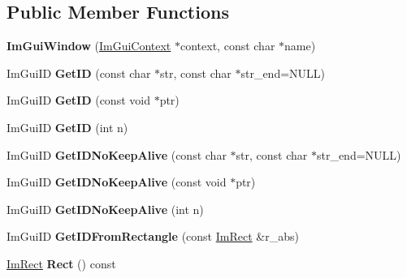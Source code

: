 \subsection*{Public Member Functions}
\begin{DoxyCompactItemize}
\item 
\mbox{\label{structImGuiWindow_acd2909ae3b7079de81d528327cc11dfd}} 
{\bfseries Im\+Gui\+Window} (\hyperlink{structImGuiContext}{Im\+Gui\+Context} $\ast$context, const char $\ast$name)
\item 
\mbox{\label{structImGuiWindow_a66400a63bc0b54d7d29e08d1b1b1a42b}} 
Im\+Gui\+ID {\bfseries Get\+ID} (const char $\ast$str, const char $\ast$str\+\_\+end=N\+U\+LL)
\item 
\mbox{\label{structImGuiWindow_aae21dffb343cabca9414499b827912a8}} 
Im\+Gui\+ID {\bfseries Get\+ID} (const void $\ast$ptr)
\item 
\mbox{\label{structImGuiWindow_a122c47ded974724a192912883fb8e0e9}} 
Im\+Gui\+ID {\bfseries Get\+ID} (int n)
\item 
\mbox{\label{structImGuiWindow_adc0a43f74a0b53a15a4bc4fea05524fe}} 
Im\+Gui\+ID {\bfseries Get\+I\+D\+No\+Keep\+Alive} (const char $\ast$str, const char $\ast$str\+\_\+end=N\+U\+LL)
\item 
\mbox{\label{structImGuiWindow_aea0ace882f6e8ec9d6825d808c975203}} 
Im\+Gui\+ID {\bfseries Get\+I\+D\+No\+Keep\+Alive} (const void $\ast$ptr)
\item 
\mbox{\label{structImGuiWindow_a9264461d998cc28e7ff7f15bc99bb1b6}} 
Im\+Gui\+ID {\bfseries Get\+I\+D\+No\+Keep\+Alive} (int n)
\item 
\mbox{\label{structImGuiWindow_a44931b6e73248930490d2c89377a8233}} 
Im\+Gui\+ID {\bfseries Get\+I\+D\+From\+Rectangle} (const \hyperlink{structImRect}{Im\+Rect} \&r\+\_\+abs)
\item 
\mbox{\label{structImGuiWindow_a147da28bf5d167cbe0a363c4a578dea1}} 
\hyperlink{structImRect}{Im\+Rect} {\bfseries Rect} () const

\end{DoxyCompactItemize}
